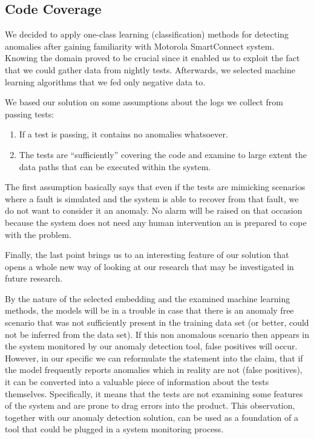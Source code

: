 
\subsection{Code Coverage}
\label{code_coverage}
We decided to apply one-class learning (classification) methods for detecting anomalies after gaining familiarity with Motorola SmartConnect system. 
Knowing the domain proved to be crucial since it enabled us to exploit the fact that we could gather data from nightly tests. 
Afterwards, we selected machine learning algorithms that we fed only negative data to.

We based our solution on some assumptions about the logs we collect from passing tests:
\begin{enumerate}

    \item If a test is passing, it contains no anomalies whatsoever.
    \item The tests are “sufficiently” covering the code and examine to large extent the data paths that can be executed within the system. 

\end{enumerate}

The first assumption basically says that even if the tests are mimicking scenarios where a fault is simulated and the system is able to recover from that fault, we do not want to consider it an anomaly. 
No alarm will be raised on that occasion because the system does not need any human intervention an is prepared to cope with the problem.

Finally, the last point brings us to an interesting feature of our solution that opens a whole new way of looking at our research that may be investigated in future research.

By the nature of the selected embedding and the examined machine learning methods, the models will be in a trouble in case that there is an anomaly free scenario that was not sufficiently present in the training data set (or better, could not be inferred from the data set). If this non anomalous scenario then appears in the system monitored by our anomaly detection tool,  false positives will occur.\\
However, in our specific we can reformulate the statement into the claim, that if the model frequently reports anomalies which in reality are not (false positives), it can be converted into  a valuable piece of information about the tests themselves. 
Specifically, it means that the tests are not examining some features of the system and are prone to drag errors into the product. 
This observation, together with our anomaly detection solution, can be used as a foundation of a tool that could be plugged in a system monitoring process.
